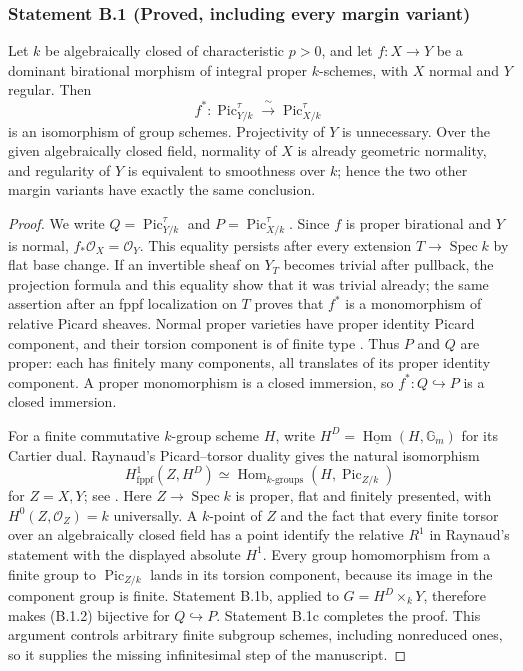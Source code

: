 \subsubsection*{Statement B.1 (Proved, including every margin variant)}
Let $k$ be algebraically closed of characteristic $p>0$, and let
$f:X\to Y$ be a dominant birational morphism of integral proper
$k$-schemes, with $X$ normal and $Y$ regular.  Then
\[
 f^*: \operatorname{Pic}^{\tau}_{Y/k}
       \xrightarrow{\ \sim\ }
       \operatorname{Pic}^{\tau}_{X/k}
 \tag{B.1.3}
\]
is an isomorphism of group schemes.  Projectivity of $Y$ is
unnecessary.  Over the given algebraically closed field, normality
of $X$ is already geometric normality, and regularity of $Y$ is
equivalent to smoothness over $k$; hence the two other margin
variants have exactly the same conclusion.
\begin{proof}
We write $Q=\operatorname{Pic}^{\tau}_{Y/k}$ and
$P=\operatorname{Pic}^{\tau}_{X/k}$.  Since $f$ is proper birational
and $Y$ is normal, $f_*\mathcal O_X=\mathcal O_Y$.  This equality
persists after every extension $T\to\operatorname{Spec}k$ by flat
base change.  If an invertible sheaf on $Y_T$ becomes trivial after
pullback, the projection formula and this equality show that it
was trivial already; the same assertion after an fppf localization
on $T$ proves that $f^*$ is a monomorphism of relative Picard
sheaves.  Normal proper varieties have proper identity Picard
component, and their torsion component is of finite type
\cite[Theorem 5.4, Remark 5.6, and Remark 6.19]{Kleiman2005}.
Thus $P$ and $Q$ are proper: each has finitely many components, all
translates of its proper identity component.  A proper
monomorphism is a closed immersion, so $f^*:Q\hookrightarrow P$
is a closed immersion.

For a finite commutative $k$-group scheme $H$, write
$H^D=\underline{\operatorname{Hom}}(H,\mathbb G_m)$ for its
Cartier dual.  Raynaud's Picard--torsor duality gives the natural
isomorphism
\[
 H^1_{\mathrm{fppf}}(Z,H^D)
 \simeq
 \operatorname{Hom}_{k\text{-groups}}(H,\operatorname{Pic}_{Z/k})
 \tag{B.1.4}
\]
for $Z=X,Y$; see \cite[Proposition 6.2.1, pp.~50--51]{Raynaud1970}.
Here $Z\to\operatorname{Spec}k$ is proper, flat and finitely
presented, with $H^0(Z,\mathcal O_Z)=k$ universally.  A $k$-point
of $Z$ and the fact that every finite torsor over an algebraically
closed field has a point identify the relative $R^1$ in Raynaud's
statement with the displayed absolute $H^1$.
Every group homomorphism from a finite group to
$\operatorname{Pic}_{Z/k}$ lands in its torsion component, because
its image in the component group is finite.  Statement B.1b,
applied to $G=H^D\times_kY$, therefore makes (B.1.2) bijective
for $Q\hookrightarrow P$.  Statement B.1c completes the proof.
This argument controls arbitrary finite subgroup schemes,
including nonreduced ones, so it supplies the missing
infinitesimal step of the manuscript.
\end{proof}

